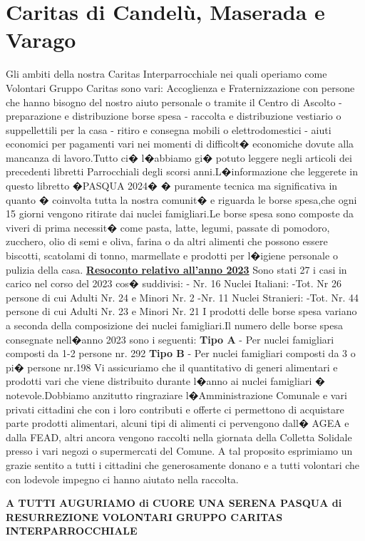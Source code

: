 \section{Caritas di Candelù, Maserada e Varago}
Gli ambiti della nostra Caritas Interparrocchiale nei quali operiamo come Volontari Gruppo Caritas sono vari: Accoglienza e Fraternizzazione con persone che hanno bisogno del nostro aiuto personale o tramite il Centro di Ascolto - preparazione e distribuzione borse spesa - raccolta e distribuzione vestiario o suppellettili per la casa - ritiro e consegna mobili o elettrodomestici - aiuti economici per pagamenti vari nei momenti di difficolt� economiche dovute alla mancanza di lavoro.Tutto ci� l�abbiamo gi� potuto leggere negli articoli dei precedenti libretti Parrocchiali degli scorsi anni.L�informazione che leggerete in questo libretto �PASQUA 2024� � puramente tecnica ma significativa in quanto � coinvolta  tutta la nostra comunit� e riguarda le borse spesa,che ogni 15 giorni vengono ritirate dai nuclei famigliari.Le borse spesa sono composte da viveri di prima necessit� come pasta, latte, legumi, passate di pomodoro, zucchero, olio di semi e oliva, farina o da altri alimenti che possono essere biscotti, scatolami di tonno, marmellate e prodotti per l�igiene personale o pulizia della casa.
\textbf{\underline{Resoconto relativo all’anno  2023}}
Sono stati 27 i casi in carico nel corso del 2023 cos� suddivisi:
- Nr. 16 Nuclei Italiani:
-Tot. Nr  26 persone di cui Adulti Nr. 24  e Minori Nr. 2
-Nr. 11 Nuclei Stranieri:
-Tot. Nr. 44 persone di cui Adulti Nr. 23 e  Minori Nr. 21
I prodotti delle borse spesa variano a seconda della composizione dei nuclei famigliari.Il numero delle borse spesa consegnate nell�anno 2023 sono i seguenti:
\textbf{Tipo A} - Per nuclei famigliari composti da 1-2 persone nr. 292
\textbf{Tipo B} - Per nuclei famigliari composti da 3 o pi� persone nr.198
Vi assicuriamo che il quantitativo di generi alimentari e prodotti vari che viene distribuito durante l�anno ai nuclei famigliari � notevole.Dobbiamo anzitutto ringraziare l�Amministrazione Comunale e vari privati cittadini che con i loro contributi e offerte ci permettono di acquistare parte prodotti alimentari, alcuni tipi di alimenti ci pervengono dall� AGEA e dalla FEAD, altri ancora vengono raccolti nella giornata della Colletta Solidale presso i vari negozi o supermercati del Comune. A tal proposito esprimiamo un grazie sentito a tutti i cittadini che generosamente donano e a tutti volontari che con lodevole impegno ci hanno aiutato nella raccolta.

\textbf{A TUTTI AUGURIAMO di CUORE UNA SERENA PASQUA di RESURREZIONE
VOLONTARI GRUPPO CARITAS INTERPARROCCHIALE}


